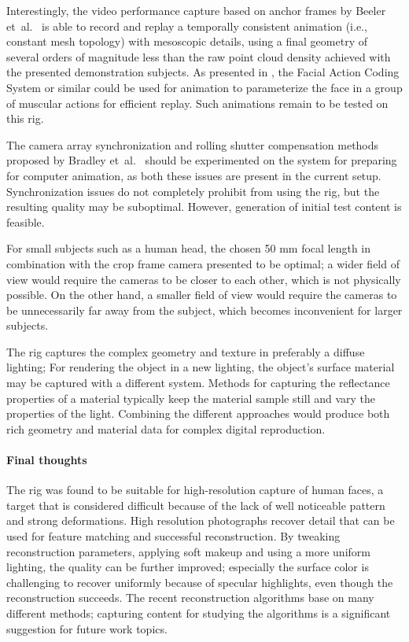 Interestingly, the video performance capture based on anchor frames by Beeler et~al.\ \cite{beeler2011high} is able to record and replay a temporally consistent animation (i.e., constant mesh topology) with mesoscopic details, using a final geometry of several orders of magnitude less than the raw point cloud density achieved with the presented demonstration subjects.
As presented in \cite{deng2007computer}, the Facial Action Coding System or similar could be used for animation to parameterize the face in a group of muscular actions for efficient replay.
Such animations remain to be tested on this rig.

The camera array synchronization and rolling shutter compensation methods proposed by Bradley et~al.\ \cite{bradley2009synchronization} should be experimented on the system for preparing for computer animation, as both these issues are present in the current setup.
Synchronization issues do not completely prohibit from using the rig, but the resulting quality may be suboptimal.
However, generation of initial test content is feasible.

For small subjects such as a human head, the chosen 50 mm focal length in combination with the crop frame camera presented to be optimal; a wider field of view would require the cameras to be closer to each other, which is not physically possible.
On the other hand, a smaller field of view would require the cameras to be unnecessarily far away from the subject, which becomes inconvenient for larger subjects.

The rig captures the complex geometry and texture in preferably a diffuse lighting;
For rendering the object in a new lighting, the object's surface material may be captured with a different system.
Methods for capturing the reflectance properties of a material typically keep the material sample still and vary the properties of the light. \cite{debevec2000acquiring} \cite{aittala2013practical}
Combining the different approaches would produce both rich geometry and material data for complex digital reproduction.

\paragraph{Final thoughts}
The rig was found to be suitable for high-resolution capture of human faces, a target that is considered difficult because of the lack of well noticeable pattern and strong deformations.
High resolution photographs recover detail that can be used for feature matching and successful reconstruction.
By tweaking reconstruction parameters, applying soft makeup and using a more uniform lighting, the quality can be further improved;
especially the surface color is challenging to recover uniformly because of specular highlights, even though the reconstruction succeeds.
The recent reconstruction algorithms base on many different methods; capturing content for studying the algorithms is a significant suggestion for future work topics.

